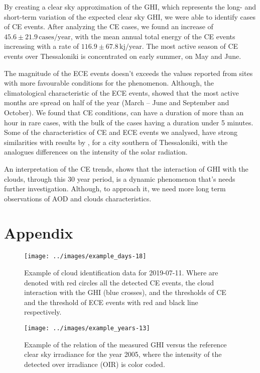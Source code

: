 \documentclass[preprint, 5p,
authoryear]{elsarticle} %
\begin{document}
By creating a clear sky approximation of the GHI, which represents the
long- and short-term variation of the expected clear sky GHI, we were
able to identify cases of CE events. After analyzing the CE cases, we
found an increase of \(45.6\pm 21.9\,\text{cases}/\text{year}\), with
the mean annual total energy of the CE events increasing with a rate of
\(116.9\pm 67.8\,\text{kj}/\text{year}\). The most active season of CE
events over Thessaloniki is concentrated on early summer, on May and
June.

The magnitude of the ECE events doesn't exceeds the values reported from
sites with more favourable conditions for the phenomenon. Although, the
climatological characteristic of the ECE events, showed that the most
active months are spread on half of the year (March -- June and
September and October). We found that CE conditions, can have a duration
of more than an hour in rare cases, with the bulk of the cases having a
duration under 5 minutes. Some of the characteristics of CE and ECE
events we analysed, have strong similarities with results by
\citet{Vamvakas2020}, for a city southern of Thessaloniki, with the
analogues differences on the intensity of the solar radiation.

An interpretation of the CE trends, shows that the interaction of GHI
with the clouds, through this 30 year period, is a dynamic phenomenon
that's needs further investigation. Although, to approach it, we need
more long term observations of AOD and clouds characteristics.

\hypertarget{appendix}{%
\section*{Appendix}\label{appendix}}

\begin{figure}[H]

{\centering \texttt{[image: ../images/example\_days-18]} 

}

\caption{Example of cloud identification data for 2019-07-11. Where are denoted with red circles all the detected CE events, the cloud interaction with the GHI (blue crosses), and the thresholds of CE and the threshold of ECE events with red and black line respectively.}\label{fig:example-day}
\end{figure}

\begin{figure}[H]

{\centering \texttt{[image: ../images/example\_years-13]} 

}

\caption{Example of the relation of the measured GHI versus the reference clear sky irradiance for the year 2005, where the intensity of the detected over irradiance (OIR) is color coded.}\label{fig:example-year}
\end{figure}


\end{document}
